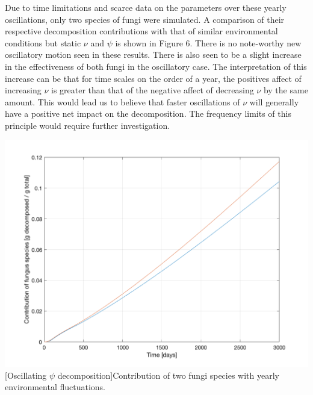 \documentclass[12pt]{article}
\newenvironment{ColumnFigure}
{\par\medskip\noindent\minipage{\linewidth}}
{\endminipage\par\medskip}
\begin{document}
\begin{multicols}{2}
Due to time limitations and scarce data on the parameters over these yearly oscillations, only two species of fungi were simulated. A comparison of their respective decomposition contributions with that of similar environmental conditions but static $\nu$ and $\psi$ is shown in Figure 6. There is no note-worthy new oscillatory motion seen in these results. There is also seen to be a slight increase in the effectiveness of both fungi in the oscillatory case. The interpretation of this increase can be that for time scales on the order of a year, the positives affect of increasing $\nu$ is greater than that of the negative affect of decreasing $\nu$ by the same amount. This would lead us to believe that faster oscillations of $\nu$ will generally have a positive net impact on the decomposition. The frequency limits of this principle would require further investigation.

\begin{ColumnFigure}\label{Oscillating nu contributions}
	\centering
	\includegraphics[width=\linewidth]{oscillating_psi_contribution.png}
	[Oscillating $\psi$ decomposition]{Contribution of two fungi species with yearly environmental fluctuations.}
\end{ColumnFigure}


\end{multicols}
\end{document}
